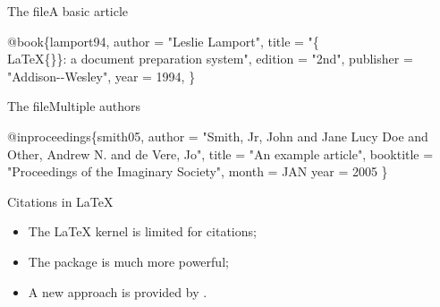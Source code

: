 \begin{frame}[fragile]{The \BibTeX{} file}{A basic article}

  \begin{example}
    \begin{semiverbatim}
\alert<2>{@book}\{\alert<3>{lamport94},
   author    = "Leslie Lamport",
   title     = 
     "\alert<4>{\{\\LaTeX\{\}\}}: a document preparation system",
   edition   = "2nd",
   publisher = "Addison-{}-Wesley",
   year      = \alert<5>{1994},
\}
    \end{semiverbatim}
  \end{example}

\end{frame}

\begin{frame}[fragile]{The \BibTeX{} file}{Multiple authors}

  \begin{example}
    \begin{semiverbatim}
@inproceedings\{smith05,
  author    = "Smith, Jr, John \alert<2>{and} Jane Lucy Doe
   \alert<2>{and} Other, Andrew N. \alert<2>{and} de Vere, Jo",
  title     = "An example article",
  booktitle = "Proceedings of the Imaginary Society",
  month     = JAN
  year      = 2005
\}
    \end{semiverbatim}
  \end{example}

\end{frame}

\begin{frame}[fragile]{Citations in \LaTeX{}}

  \begin{itemize}
    \item The \LaTeX{} kernel is limited for citations;
    \item The  package is much more powerful;
    \item A new approach is provided by .
  \end{itemize}

\end{frame}

